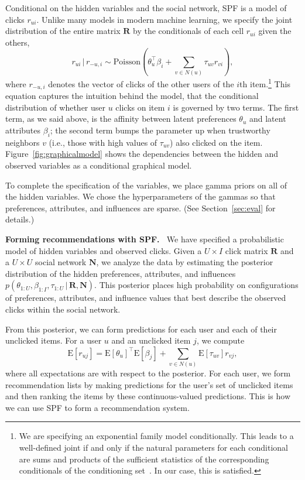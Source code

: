 \documentclass{sig-alternate-2013}
\newcommand{\mypar}[1]{\vspace{0.05in} \noindent \textbf{#1 \,}}
\newcommand{\E}{\mathrm{E}}
\newcommand{\g}{\, | \,}
\begin{document}
Conditional on the hidden variables and the social network, SPF is a
model of clicks $r_{ui}$.  Unlike many models in modern machine
learning, we specify the joint distribution of the entire matrix
$\mathbf{R}$ by the conditionals of each cell $r_{ui}$ given the
others,
\begin{equation}
  \label{eq:ratings}
  r_{ui} \, \vert \, r_{-u, i} \sim
  \mbox{Poisson}\left(\textstyle \theta_u^\top \beta_i + \sum_{v\in
      N(u)} \tau_{uv} r_{vi}\right),
\end{equation}
where $r_{-u, i}$ denotes the vector of clicks of the other users
of the $i$th item.\footnote{We are specifying an exponential family
  model conditionally.  This leads to a well-defined joint if and only
  if the natural parameters for each conditional are sums and products
  of the sufficient statistics of the corresponding conditionals of
  the conditioning set~\cite{Arnold1999}.  In our case, this is
  satisfied.} This equation captures the intuition behind the model,
that the conditional distribution of whether user $u$ clicks on item
$i$ is governed by two terms.  The first term, as we said above, is
the affinity between latent preferences $\theta_u$ and latent
attributes $\beta_i$; the second term bumps the parameter up when
trustworthy neighbors $v$ (i.e., those with high values of
$\tau_{uv}$) also clicked on the item.  Figure~\ref{fig:graphicalmodel}
shows the dependencies between the hidden and observed variables as
a conditional graphical model.

To complete the specification of the variables, we place gamma priors
on all of the hidden variables.  We chose the hyperparameters of the
gammas so that preferences, attributes, and influences are sparse.
(See Section~\ref{sec:eval} for details.)

\mypar{Forming recommendations with SPF.}  We have specified a
probabilistic model of hidden variables and observed clicks. Given
a $U \times I$ click matrix $\mathbf{R}$ and a $U \times U$ social
network $\mathbf{N}$, we analyze the data by estimating the posterior
distribution of the hidden preferences, attributes, and influences
$p(\theta_{1:U}, \beta_{1:I}, \tau_{1:U} \g \mathbf{R}, \mathbf{N})$.
This posterior places high probability on configurations of
preferences, attributes, and influence values that best describe the
observed clicks within the social network.

From this posterior, we can form predictions for each user and each of
their unclicked items.  For a user $u$ and an unclicked item $j$,
we compute
\begin{equation}
  \label{eq:recommendation}
  \E\left[r_{uj}\right] =
  \E\left[\theta_u\right]^\top \E\left[\beta_j\right] +
  \sum_{v \in N(u)} \E\left[\tau_{uv}\right] r_{vj},
\end{equation}
where all expectations are with respect to the posterior.  For each
user, we form recommendation lists by making predictions for the
user's set of unclicked items and then ranking the items by these
continuous-valued predictions.  This is how we can use SPF to form a
recommendation system.
\end{document}
